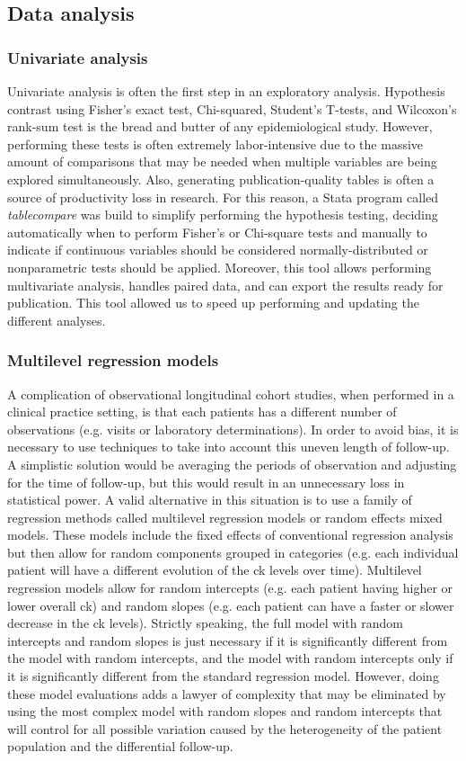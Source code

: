 \subsection{Data analysis}
\subsubsection{Univariate analysis}
Univariate analysis is often the first step in an exploratory analysis. Hypothesis contrast using Fisher's exact test, Chi-squared, Student's T-tests, and Wilcoxon's rank-sum test is the bread and butter of any epidemiological study. However, performing these tests is often extremely labor-intensive due to the massive amount of comparisons that may be needed when multiple variables are being explored simultaneously. Also, generating publication-quality tables is often a source of productivity loss in research. For this reason, a Stata program called \textit{table\textunderscore compare} was build to simplify performing the hypothesis testing, deciding automatically when to perform Fisher's or Chi-square tests and manually to indicate if continuous variables should be considered normally-distributed or nonparametric tests should be applied. Moreover, this tool allows performing multivariate analysis, handles paired data, and can export the results ready for publication. This tool allowed us to speed up performing and updating the different analyses.

\subsubsection{Multilevel regression models}
A complication of observational longitudinal cohort studies, when performed in a clinical practice setting, is that each patients has a different number of observations (e.g. visits or laboratory determinations). In order to avoid bias, it is necessary to use techniques to take into account this uneven length of follow-up. A simplistic solution would be averaging the periods of observation and adjusting for the time of follow-up, but this would result in an unnecessary loss in statistical power. A valid alternative in this situation is to use a family of regression methods called multilevel regression models or random effects mixed models. These models include the fixed effects of conventional regression analysis but then allow for random components grouped in categories (e.g. each individual patient will have a different evolution of the \gls{ck} levels over time). Multilevel regression models allow for random intercepts (e.g. each patient having higher or lower overall \gls{ck}) and random slopes (e.g. each patient can have a faster or slower decrease in the \gls{ck} levels). Strictly speaking, the full model with random intercepts and random slopes is just necessary if it is significantly different from the model with random intercepts, and the model with random intercepts only if it is significantly different from the standard regression model. However, doing these model evaluations adds a lawyer of complexity that may be eliminated by using the most complex model with random slopes and random intercepts that will control for all possible variation caused by the heterogeneity of the patient population and the differential follow-up.

